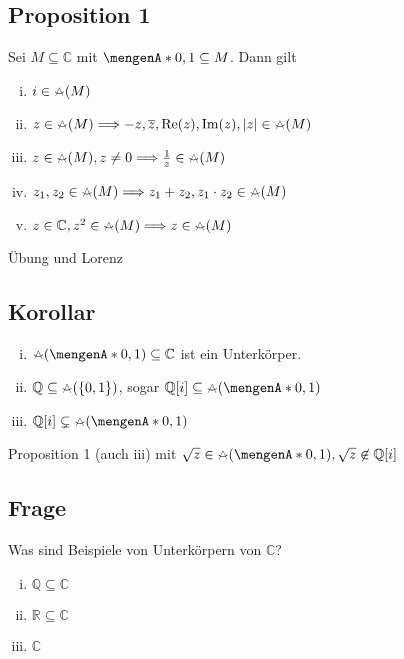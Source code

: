 \subsection[{Proposition 1: Elemente aus $M \subseteq \mathds{C}$, mit $\{0,1\} \subseteq M $}]{Proposition 1} %
\label{sub:105}
Sei $M \subseteq \mathds{C}$ mit $\set{0,1} \subseteq M$. Dann gilt
\begin{enumerate}[i)]
	\item $i \in \zirkel(M)$
	\item $z \in \zirkel(M) \Longrightarrow -z, \overline{z}, \re(z), \im(z), \abs*{z} \in \zirkel(M)$
	\item $z \in \zirkel(M), z \not= 0 \Longrightarrow \frac{1}{z} \in \zirkel(M) $
	\item $z_1, z_2 \in \zirkel(M) \Longrightarrow z_1 +z_2, z_1 \cdot z_2 \in \zirkel(M)$
	\item $z \in \mathds{C}, z^2 \in \zirkel(M) \Longrightarrow z \in \zirkel (M)$
\end{enumerate}
Übung und Lorenz

\subsection[Korollar: Die konstruierbaren Zahlen bilden einen Unterkörper von $\mathds{C}$]{Korollar} %
\label{sub:106}
\begin{enumerate}[i)]
	\item $\zirkel (\set{0,1} ) \subseteq \mathds{C}$ ist ein Unterkörper.
	\item $\mathds{Q} \subseteq \zirkel(\{0,1\})$, sogar $\mathds{Q}[i] \subseteq \zirkel(\set{0,1} )$
	\item $\mathds{Q}[i] \subsetneq \zirkel(\set{0,1} ) $
\end{enumerate}
Proposition 1 (auch iii) mit $\sqrt{z} \in \zirkel(\set{0,1}), \sqrt{z} \not\in \mathds{Q}[i]$

\subsection[Frage nach Unterkörpern von $\mathds{C}$]{Frage} %
\label{sub:107}
Was sind Beispiele von Unterkörpern von $\mathds{C}$?
\begin{multicols}{3}
	\begin{enumerate}[(i)]
		\item $\mathds{Q} \subseteq \mathds{C}$
		\item $\mathds{R} \subseteq \mathds{C}$
		\item $\mathds{C}$
	\end{enumerate}
\end{multicols}

